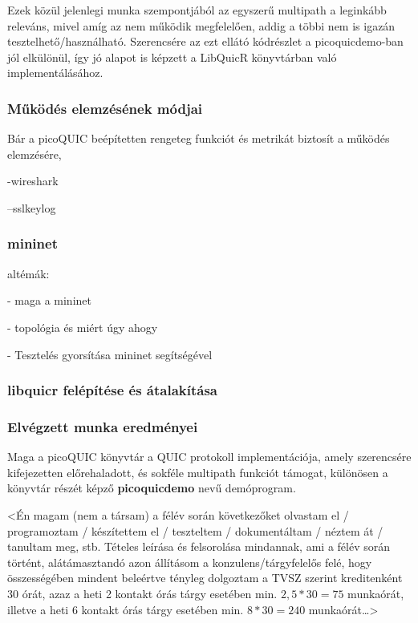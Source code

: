 \documentclass[a4paper,oneside]{article}
\begin{document}
Ezek közül jelenlegi munka szempontjából az egyszerű multipath a leginkább releváns,
mivel amíg az nem működik megfelelően, addig a többi nem is igazán tesztelhető/használható.
Szerencsére az ezt ellátó kódrészlet a picoquicdemo-ban jól elkülönül, így jó alapot is képzett
a LibQuicR könyvtárban való implementálásához.

\subsubsection{Működés elemzésének módjai}

Bár a picoQUIC beépítetten rengeteg funkciót és metrikát biztosít a működés elemzésére,

-wireshark

--sslkeylog

\subsubsection{mininet}

altémák:

- maga a mininet

- topológia és miért úgy ahogy

- Tesztelés gyorsítása mininet segítségével

\subsubsection{libquicr felépítése és átalakítása}

\subsubsection{Elvégzett munka eredményei}




Maga a picoQUIC könyvtár a QUIC protokoll implementációja, amely szerencsére
kifejezetten előrehaladott, és sokféle multipath funkciót támogat, különösen 
a könyvtár részét képző \textbf{picoquicdemo} nevű demóprogram.



<Én magam (nem a társam) a félév során következőket olvastam el /
programoztam / készítettem el / teszteltem / dokumentáltam / néztem át
/ tanultam meg, stb.  Tételes leírása és felsorolása mindannak, ami a
félév során történt, alátámasztandó azon állításom a
konzulens/tárgyfelelős felé, hogy összességében mindent beleértve
tényleg dolgoztam a TVSZ szerint kreditenként 30 órát, azaz a heti 2
kontakt órás tárgy esetében min. $2,5*30 = 75$ munkaórát, illetve a
heti 6 kontakt órás tárgy esetében min. $8*30 = 240$ munkaórát\dots>
\end{document}
